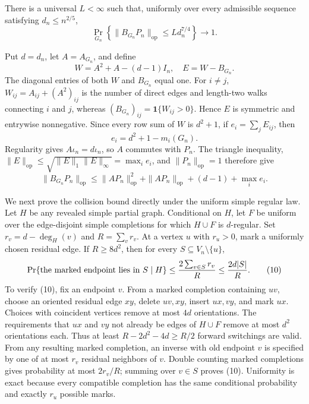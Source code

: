 There is a universal \(L<\infty\) such that, uniformly over every
admissible sequence satisfying \(d_n\le n^{2/5}\),
\[
\Pr_{G_n}\!\left\{\|B_{G_n}P_n\|_{\mathrm{op}}
\le Ld_n^{7/4}\right\}\longrightarrow1.
\]

Put \(d=d_n\), let \(A=A_{G_n}\), and define
\[
W=A^2+A-(d-1)I_n,
\quad E=W-B_{G_n}.
\tag{7}
\]
The diagonal entries of both \(W\) and \(B_{G_n}\) equal one.  For
\(i\ne j\), \(W_{ij}=A_{ij}+(A^2)_{ij}\) is the number of direct edges
and length-two walks connecting \(i\) and \(j\), whereas
\((B_{G_n})_{ij}=\mathbf 1\{W_{ij}>0\}\).  Hence \(E\) is symmetric and
entrywise nonnegative.  Since every row sum of \(W\) is \(d^2+1\), if
\(e_i=\sum_jE_{ij}\), then
\[
e_i=d^2+1-m_i(G_n).
\tag{8}
\]
Regularity gives \(A\iota_n=d\iota_n\), so \(A\) commutes with \(P_n\).
The triangle inequality, \(\|E\|_{\mathrm{op}}\le
\sqrt{\|E\|_1\|E\|_\infty}=\max_i e_i\), and \(\|P_n\|_{\mathrm{op}}=1\)
therefore give
\[
\|B_{G_n}P_n\|_{\mathrm{op}}
\le \|A P_n\|_{\mathrm{op}}^2+
\|A P_n\|_{\mathrm{op}}+(d-1)+\max_i e_i.
\tag{9}
\]

We next prove the collision bound directly under the uniform simple
regular law.  Let \(H\) be any revealed simple partial graph.  Conditional
on \(H\), let \(F\) be uniform over the edge-disjoint simple completions
for which \(H\cup F\) is \(d\)-regular.  Set
\(r_v=d-\deg_H(v)\) and \(R=\sum_vr_v\).  At a vertex \(u\) with
\(r_u>0\), mark a uniformly chosen residual edge.  If \(R\ge8d^2\), then
for every \(S\subseteq V_n\setminus\{u\}\),
\[
\Pr\{\hbox{the marked endpoint lies in }S\mid H\}
\le \frac{2\sum_{v\in S}r_v}{R}
\le\frac{2d|S|}{R}.
\tag{10}
\]
To verify (10), fix an endpoint \(v\).  From a marked completion containing
\(uv\), choose an oriented residual edge \(xy\), delete \(uv,xy\), insert
\(ux,vy\), and mark \(ux\).  Choices with coincident vertices remove at
most \(4d\) orientations.  The requirements that \(ux\) and \(vy\) not
already be edges of \(H\cup F\) remove at most \(d^2\) orientations each.
Thus at least \(R-2d^2-4d\ge R/2\) forward switchings are valid.  From any
resulting marked completion, an inverse with old endpoint \(v\) is
specified by one of at most \(r_v\) residual neighbors of \(v\).  Double
counting marked completions gives probability at most \(2r_v/R\); summing
over \(v\in S\) proves (10).  Uniformity is exact because every compatible
completion has the same conditional probability and exactly \(r_u\)
possible marks.

